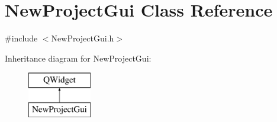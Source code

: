 \hypertarget{class_new_project_gui}{\section{New\-Project\-Gui Class Reference}
\label{class_new_project_gui}
}


{\ttfamily \#include $<$New\-Project\-Gui.\-h$>$}

Inheritance diagram for New\-Project\-Gui\-:\begin{figure}[H]
\begin{center}
\leavevmode
\includegraphics[height=2.000000cm]{class_new_project_gui}
\end{center}
\end{figure}
